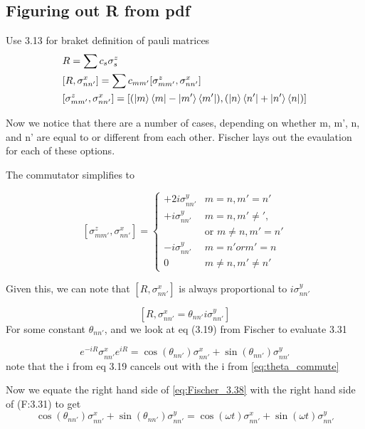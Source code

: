 \documentclass[12pt]{article}
\begin{document}
\subsection{Figuring out R from pdf}

Use 3.13 for braket definition of pauli matrices
\begin{align}
    & R = \sum c_s \sigma^z_s \label{eq:R_expansion}\\
    & [R, \sigma^x_{nn'}] = \sum c_{mm'} [\sigma^z_{mm'}, \sigma^x_{nn'}]\\
    & [\sigma^z_{mm'}, \sigma^x_{nn'}] = [(\ket{m} \bra{m} - \ket{m'} \bra{m'}), (\ket{n} \bra{n'} + \ket{n'}\bra{n})]
\end{align}

Now we notice that there are a number of cases, depending on whether m, m', n,
and n' are equal to or different from each other. Fischer lays out the
evaulation for each of these options.

The commutator simplifies to

\begin{equation}\label{eq:commutator_cases}
    [\sigma^z_{mm'}, \sigma^x_{nn'}] = 
    \begin{cases}
        +2 i \sigma^y_{nn'} & m=n, m'=n' \\
        + i \sigma^y_{nn'} & m=n, m' \neq ',\\
        & \text{or } m \neq n, m'=n'\\
        - i \sigma^y_{nn'} & m=n' or m'=n \\
        0 & m \neq n, m' \neq n'
    \end{cases}
\end{equation}

Given this, we can note that $[R, \sigma^x_{nn'}]$ is always proportional to $i
\sigma^y_{nn'}$

\begin{equation}\label{eq:theta_commute}
    [R, \sigma^x_{nn'} = \theta_{nn'} i\sigma^y_{nn'}]
\end{equation}
For some constant $\theta_{nn'}$, and we look at eq (3.19) from Fischer to evaluate 3.31

\begin{equation} \label{eq:Fischer_3.38}
    e^{-i R} \sigma^x_{nn'} e^{iR} = \cos{(\theta_{nn'})}\sigma^x_{nn'} + \sin{(\theta_{nn'})} \sigma^y_{nn'}
\end{equation}
note that the i from eq 3.19 cancels out with the i from \eqref{eq:theta_commute}

Now we equate the right hand side of \eqref{eq:Fischer_3.38} with the right hand side of (F:3.31) to get
\begin{equation}\label{eq:theta_eq_wt}
    \cos{(\theta_{nn'})}\sigma^x_{nn'} + \sin{(\theta_{nn'})} \sigma^y_{nn'}
    = \cos{(\omega t)}\sigma^x_{nn'} + \sin{(\omega t)} \sigma^y_{nn'}
\end{equation}
\end{document}
